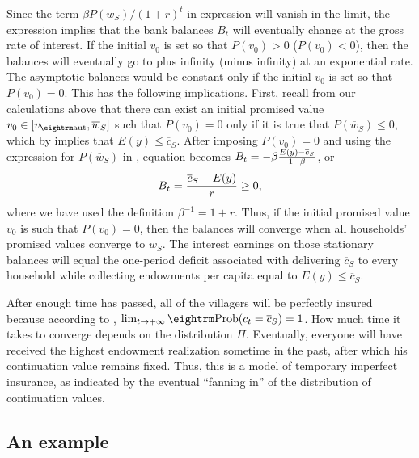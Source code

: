 Since the term $\beta P(\overline w_S)/(1+r)^t$ in expression
 will vanish in the limit, the expression implies
that the bank balances $B_t$ will eventually change at the gross
rate of interest. If the initial $v_0$ is set so that
$P(v_0)>0$ ($P(v_0)<0$), then the balances will eventually go to
plus infinity (minus infinity) at an exponential rate. The
asymptotic balances would  be constant only if the initial $v_0$
is set so that $P(v_0)=0$. This has the following implications. First,
recall from our calculations above that there can  exist an
initial promised value $v_0 \in [v_{\rm aut}, \overline w_S]$ such
that $P(v_0)=0$ only if it is true that $P(\overline w_S) \leq 0$,
which by  implies that $E(y)\leq\overline c_S$.
After imposing $P(v_0)=0$ and using the expression for
$P(\overline w_S)$ in , equation 
becomes $ B_t = - \beta {E(y) - \overline c_S \over 1-\beta}$, or
$$ B_t = {\overline c_S - E(y) \over r} \geq 0,
$$
where we have used the definition $\beta^{-1} = 1+r$. Thus, if the
initial promised value $v_0$ is such that $P(v_0)=0$, then the
balances will converge when all households' promised values
converge to $\overline w_S$. The interest earnings on those
stationary balances will equal  the one-period deficit associated
with delivering $\overline c_S$ to every household while
collecting endowments per capita equal to $E(y) \leq \overline
c_S$.




After enough time has passed, all of the villagers will  be perfectly
insured because according to , $\lim_{t \rightarrow
+\infty} {\rm Prob}(c_t = \overline c_S) =1$.
  How much time it takes to converge depends
on the distribution $\Pi$. Eventually, everyone will have received
the highest endowment realization sometime in the past, after
which his continuation value remains fixed.   Thus, this is a
model of temporary imperfect insurance, as indicated by the
eventual ``fanning in'' of the distribution of continuation values.


\subsection{An example}


